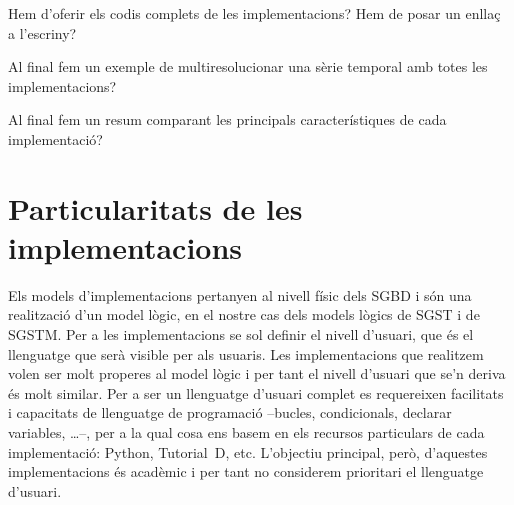  Hem d'oferir els codis complets de les implementacions?
Hem de posar un enllaç a l'escriny?


 Al final fem un exemple de multiresolucionar una sèrie temporal amb totes les implementacions?

 Al final fem un resum comparant les principals característiques de cada implementació?












\section{Particularitats de les implementacions}



Els models d'implementacions pertanyen al nivell físic dels \gls{SGBD}
i són una realització d'un model lògic, en el nostre cas dels models
lògics de \gls{SGST} i de \gls{SGSTM}. Per a les implementacions se
sol definir el nivell d'usuari, que és el llenguatge que serà visible
per als usuaris. Les implementacions que realitzem volen ser molt
properes al model lògic i per tant el nivell d'usuari que se'n deriva
és molt similar. Per a ser un llenguatge d'usuari complet es
requereixen facilitats i capacitats de llenguatge de programació
--bucles, condicionals, declarar variables, \dots--, per a la qual
cosa ens basem en els recursos particulars de cada implementació:
Python, Tutorial~D, etc. L'objectiu principal, però, d'aquestes
implementacions és acadèmic i per tant no considerem prioritari el
llenguatge d'usuari.

